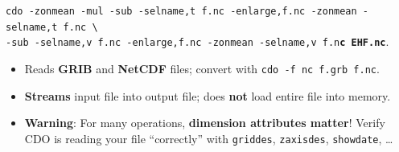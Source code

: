 \documentclass[aspectratio=169]{beamer}
\begin{document}
\begin{frame}
  \begin{center}
    \vspace{-5pt}
        \texttt{{\color{red}cdo -zonmean -mul -sub -selname,t f.nc -enlarge,f.nc -zonmean -selname,t f.nc \textbackslash}}\\
        \texttt{{\color{red}-sub -selname,v f.nc -enlarge,f.nc -zonmean -selname,v f.n\textbf{c EHF.nc}}}.
    \end{center}
    \begin{itemize}
        \item
          Reads \textbf{GRIB} and \textbf{NetCDF} files; convert with \texttt{cdo -f nc f.grb f.nc}.
        \item
          \textbf{Streams} input file into output file; does \textbf{not} load entire file into memory.
        \item
          \textbf{{\color{red}Warning}}: For many operations,
          \textbf{dimension attributes matter}!
          Verify CDO is reading your file ``correctly'' with
          \texttt{griddes}, \texttt{zaxisdes}, \texttt{showdate}, \ldots
  \end{itemize}
\end{frame}
\end{document}
